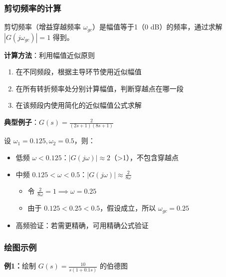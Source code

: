 \subsubsection{剪切频率的计算}

剪切频率（增益穿越频率 $\omega_{gc}$）是幅值等于1（0 dB）的频率，通过求解 $|G(j\omega_{gc})| = 1$ 得到。

\textbf{计算方法}：利用幅值近似原则
\begin{enumerate}
    \item 在不同频段，根据主导环节使用近似幅值
    \item 在所有转折频率处分别计算幅值，判断穿越点在哪一段
    \item 在该频段内使用简化的近似幅值公式求解
\end{enumerate}

\textbf{典型例子}：$G(s) = \frac{2}{(2s+1)(8s+1)}$

设 $\omega_1 = 0.125, \omega_2 = 0.5$，则：
\begin{itemize}
    \item 低频 $\omega < 0.125$：$|G(j\omega)| \approx 2$（>1），不包含穿越点
    \item 中频 $0.125 < \omega < 0.5$：$|G(j\omega)| \approx \frac{2}{8\omega}$
    \begin{itemize}
        \item 令 $\frac{2}{8\omega} = 1 \implies \omega = 0.25$
        \item 由于 $0.125 < 0.25 < 0.5$，假设成立，所以 $\omega_{gc} = 0.25$
    \end{itemize}
    \item 高频验证：若需更精确，可用精确公式验证
\end{itemize}

\subsubsection{绘图示例}

\textbf{例1：}绘制 $G(s) = \frac{10}{s(1+0.1s)}$ 的伯德图

